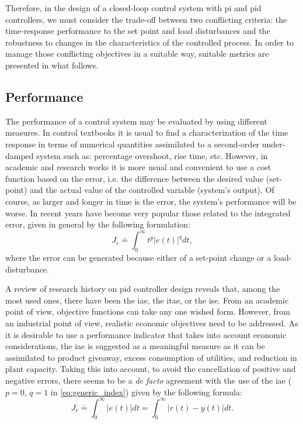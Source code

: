 Therefore, in the design of a closed-loop control system with \gls{pi} and \gls{pid} controllers, we must consider the trade-off between two conflicting criteria: the time-response performance to the set point and load disturbances and the robustness to changes in the characteristics of the controlled process. In order to manage those conflicting objectives in a suitable way, suitable metrics are presented in what follows.
 
\subsection{Performance}
%
The performance of a control system may be evaluated by using different measures. In control textbooks it is usual to find a characterization of the time response in terms of numerical quantities assimilated to a second-order under-damped system such as: percentage overshoot, rise time, etc. However, in academic and research works it is more usual and convenient to use a cost function based on the error, i.e. the difference between the desired value (set-point) and the actual value of the controlled variable (system's output).  Of course, as larger and longer in time is the error, the system's performance will be worse. In recent years have become very popular those related to the integrated error, given in general by the following formulation:
%
\begin{equation}
	J_{e} \doteq \int^{\infty}_{0} t^p \left|e(t)\right|^q dt,  \label{eq:generic_index}
\end{equation}
%
where the error can be generated because either of a set-point change or a load-disturbance.

A review of research history on \gls{pid} controller design reveals that, among the most used ones, there have been the \gls{iae}, the \gls{itae}, or the \gls{ise}. From an academic point of view, objective functions can take any one wished form. However, from an industrial point of view, realistic economic objectives need to be addressed. As it is desirable to use a performance indicator that takes into account economic considerations, the \gls{iae} is suggested \citet{Shinskey2002} as a meaningful measure as it can be assimilated to product giveaway, excess consumption of utilities, and reduction in plant capacity. Taking this into account, to avoid the cancellation of positive and negative errors, there seems to be a \emph{de facto} agreement with the use of the \gls{iae} ($p=0$, $q=1$ in \ref{eq:generic_index}) given by the following formula:
%
\begin{equation}
	J_e \doteq \int^{\infty}_{0} \left|e(t) \right| dt = \int^{\infty}_{0} \left|r(t)-y(t) \right| dt. 
\end{equation}
%
